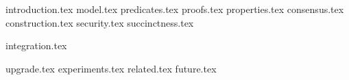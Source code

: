 {introduction.tex}
{model.tex}
{predicates.tex}
{proofs.tex}
{properties.tex}
{consensus.tex}
{construction.tex}
{security.tex}
{succinctness.tex}

{integration.tex}

{upgrade.tex}
{experiments.tex}
{related.tex}
{future.tex}
